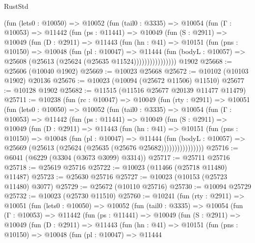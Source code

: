 \begin{lexlean}{RustStd}
\begin{coremodule}
          (fun (lets0 : @10050) =>
          @10052
            (fun (tail0 : @3335) =>
            @10054
              (fun (Γ : @10053) =>
              @11442
                (fun (ps : @11441) =>
                @10049
                  (fun (S : @2911) =>
                  @10049
                    (fun (D : @2911) =>
                    @11443
                      (fun (hn : @41) =>
                      @10151
                        (fun (pns : @10150) =>
                        @10048
                          (fun (pl : @10047) =>
                          @11444
                            (fun (bodyL : @10057) =>
                            @25608 (@25613 (@25624 (@25635 @11524))))))))))))))))
    @1902
@25668 := @25606 (@10040 @1902)
@25669 := @10023 @25668
@25672 := @10102 (@10103 @1902) @20136
@25676 := @10023 (@10094 (@25672 @11506) @11510)
@25677 := @10128 @1902
@25682 := @11515 (@11516 @25677 @20139 @11477 @11479)
@25711 := @10238
    (fun (rc : @10047) =>
    @10049
      (fun (rty : @2911) =>
      @10051
        (fun (lets0 : @10050) =>
        @10052
          (fun (tail0 : @3335) =>
          @10054
            (fun (Γ : @10053) =>
            @11442
              (fun (ps : @11441) =>
              @10049
                (fun (S : @2911) =>
                @10049
                  (fun (D : @2911) =>
                  @11443
                    (fun (hn : @41) =>
                    @10151
                      (fun (pns : @10150) =>
                      @10048
                        (fun (pl : @10047) =>
                        @11444
                          (fun (bodyL : @10057) =>
                          @25669 (@25613 (@25624 (@25635 (@25676 @25682))))))))))))))))
@25716 := @6041 (@6229 (@3304 (@3673 @3099) @3314))
@25717 := @25711 @25716
@25718 := @25619 @25716
@25722 := @10023 (@11466 (@25718 @11480) @11487)
@25723 := @25630 @25716
@25727 := @10023 (@10153 (@25723 @11480) @3077)
@25729 := @25672 (@10110 @25716)
@25730 := @10094 @25729
@25732 := @10023 (@25730 @11510)
@25760 := @10241
    (fun (rty : @2911) =>
    @10051
      (fun (lets0 : @10050) =>
      @10052
        (fun (tail0 : @3335) =>
        @10054
          (fun (Γ : @10053) =>
          @11442
            (fun (ps : @11441) =>
            @10049
              (fun (S : @2911) =>
              @10049
                (fun (D : @2911) =>
                @11443
                  (fun (hn : @41) =>
                  @10151
                    (fun (pns : @10150) =>
                    @10048
                      (fun (pl : @10047) =>
                      @11444

\end{coremodule}
\end{lexlean}
